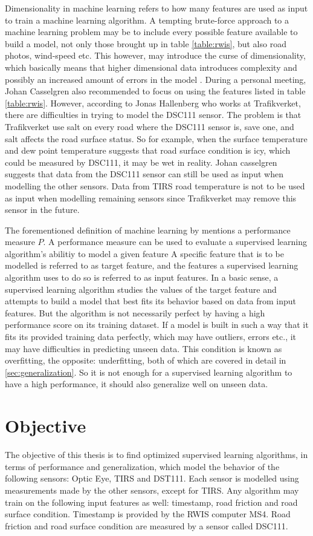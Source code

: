 	Dimensionality in machine learning refers to how many features are used as input to train a machine learning algorithm. A tempting brute-force approach to a machine learning problem may be to include every possible feature available to build a model, not only those brought up in table \ref{table:rwis}, but also road photos, wind-speed etc. This however, may introduce the curse of dimensionality, which basically means that higher dimensional data introduces complexity and possibly an increased amount of errors in the model \cite{BOOK:6}. During a personal meeting, Johan Casselgren also recommended to focus on using the features listed in table \ref{table:rwis}. However, according to Jonas Hallenberg who works at Trafikverket, there are difficulties in trying to model the DSC111 sensor. The problem is that Trafikverket use salt on every road where the DSC111 sensor is, save one, and salt affects the road surface status. So for example, when the surface temperature and dew point temperature suggests that road surface condition is icy, which could be measured by DSC111, it may be wet in reality. Johan casselgren suggests that data from the DSC111 sensor can still be used as input when modelling the other sensors. Data from TIRS road temperature is not to be used as input when modelling remaining sensors since Trafikverket may remove this sensor in the future. 
	
	The forementioned definition of machine learning by \cite{BOOK:2} mentions a performance measure $P$. A performance measure can be used to evaluate a supervised learning algorithm's abilitiy to model a given feature A specific feature that is to be modelled is referred to as target feature, and the features a supervised learning algorithm uses to do so is referred to as input features. In a basic sense, a supervised learning algorithm studies the values of the target feature and attempts to build a model that best fits its behavior based on data from input features. But the algorithm is not necessarily perfect by having a high performance score on its training dataset. If a model is built in such a way that it fits its provided training data perfectly, which may have outliers, errors etc., it may have difficulties in predicting unseen data. This condition is known as overfitting, the opposite: underfitting, both of which are covered in detail in \ref{sec:generalization}. So it is not enough for a supervised learning algorithm to have a high performance, it should also generalize well on unseen data. 

\section{Objective} \label{sec:objective}
	The objective of this thesis is to find optimized supervised learning algorithms, in terms of performance and generalization, which model the behavior of the following sensors: Optic Eye, TIRS and DST111. Each sensor is modelled using measurements made by the other sensors, except for TIRS. Any algorithm may train on the following input features as well: timestamp, road friction and road surface condition. Timestamp is provided by the RWIS computer MS4. Road friction and road surface condition are measured by a sensor called DSC111.
	
